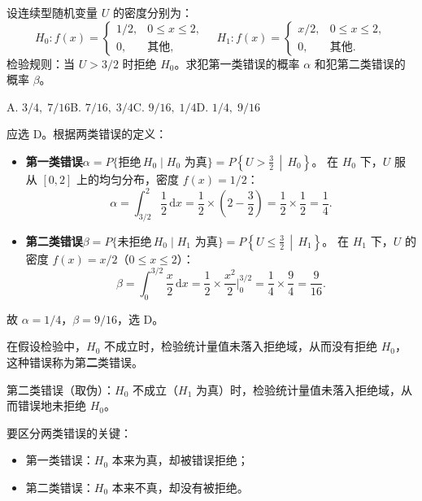 ﻿\documentclass[lang=cn,11pt]{elegantbook}
\begin{document}
\begin{exercise}\label{exer:9-error-calc}
设连续型随机变量 \(U\) 的密度分别为：
\[
H_0\colon f(x)=\begin{cases}1/2, & 0\leq x\leq2,\\0, & \text{其他},\end{cases}
\quad
H_1\colon f(x)=\begin{cases}x/2, & 0\leq x\leq2,\\0, & \text{其他}.\end{cases}
\]
检验规则：当 \(U>3/2\) 时拒绝 \(H_0\)。求犯第一类错误的概率 \(\alpha\) 和犯第二类错误的概率 \(\beta\)。\par
A. \(3/4,\;7/16\)\qquad B. \(7/16,\;3/4\)\qquad C. \(9/16,\;1/4\)\qquad D. \(1/4,\;9/16\)
\end{exercise}
\begin{solution}
应选 D。根据两类错误的定义：
\begin{itemize}
    \item \textbf{第一类错误}\(\alpha = P\{\text{拒绝}\,H_0 \mid H_0\text{ 为真}\} = P\!\left\{U>\tfrac{3}{2}\,\middle|\,H_0\right\}\)。
    在 \(H_0\) 下，\(U\) 服从 \([0,2]\) 上的均匀分布，密度 \(f(x)=1/2\)：
    \[
    \alpha = \int_{3/2}^{2}\frac{1}{2}\,\mathrm{d}x = \frac{1}{2}\times\left(2-\frac{3}{2}\right) = \frac{1}{2}\times\frac{1}{2} = \frac{1}{4}.
    \]
    \item \textbf{第二类错误}\(\beta = P\{\text{未拒绝}\,H_0 \mid H_1\text{ 为真}\} = P\!\left\{U\leq\tfrac{3}{2}\,\middle|\,H_1\right\}\)。
    在 \(H_1\) 下，\(U\) 的密度 \(f(x)=x/2\)（\(0\leq x\leq2\)）：
    \[
    \beta = \int_0^{3/2}\frac{x}{2}\,\mathrm{d}x = \frac{1}{2}\times\frac{x^2}{2}\Bigg|_0^{3/2} = \frac{1}{4}\times\frac{9}{4} = \frac{9}{16}.
    \]
\end{itemize}
故 \(\alpha=1/4\)，\(\beta=9/16\)，选 D。
\end{solution}


\begin{exercise}\label{exer:9-error-concept1}
在假设检验中，\(H_0\) 不成立时，检验统计量值未落入拒绝域，从而没有拒绝 \(H_0\)，这种错误称为第\textbf{二}类错误。
\end{exercise}
\begin{solution}
第二类错误（取伪）：\(H_0\) 不成立（\(H_1\) 为真）时，检验统计量值未落入拒绝域，从而错误地未拒绝 \(H_0\)。
\begin{note}
要区分两类错误的关键：
\begin{itemize}
    \item 第一类错误：\(H_0\) 本来为真，却被错误拒绝；
    \item 第二类错误：\(H_0\) 本来不真，却没有被拒绝。
\end{itemize}
\end{note}
\end{solution}
\end{document}
